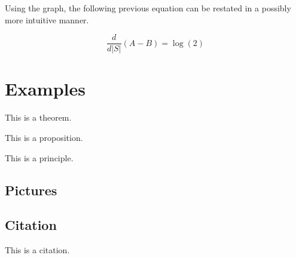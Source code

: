 \documentclass{article}
\begin{document}
Using the graph, the following previous equation can be restated in a possibly more intuitive manner.

\begin{equation}
	\frac{d}{d|S|}(A-B)=\log(2)
\end{equation}


\section{Examples}

\begin{theorem}
    This is a theorem.
\end{theorem}

\begin{proposition}
    This is a proposition.
\end{proposition}

\begin{principle}
    This is a principle.
\end{principle}


\subsection{Pictures}


\subsection{Citation}

This is a citation\cite{Eg}.

\newpage





\end{document}
